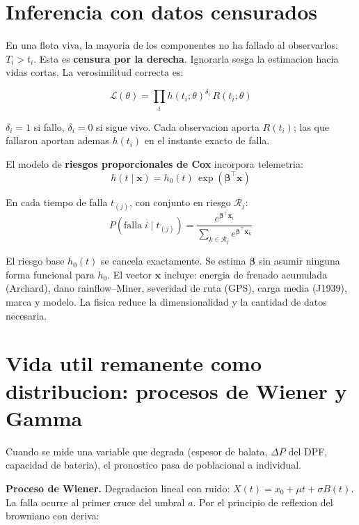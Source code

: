 \documentclass[10.5pt,a4paper]{article}
\begin{document}
\section{Inferencia con datos censurados}

En una flota viva, la mayoria de los componentes no ha fallado al observarlos:
$T_i > t_i$. Esta es \textbf{censura por la derecha}. Ignorarla sesga la estimacion
hacia vidas cortas. La verosimilitud correcta es:

\begin{mathbox}
$$\mathcal{L}(\theta) = \prod_i h(t_i;\theta)^{\delta_i}\,R(t_i;\theta)$$

$\delta_i = 1$ si fallo, $\delta_i = 0$ si sigue vivo. Cada observacion aporta
$R(t_i)$; las que fallaron aportan ademas $h(t_i)$ en el instante exacto de falla.
\end{mathbox}

El modelo de \textbf{riesgos proporcionales de Cox} incorpora telemetria:
$$h(t \mid \mathbf{x}) = h_0(t)\,\exp(\boldsymbol\beta^\top\mathbf{x})$$

En cada tiempo de falla $t_{(j)}$, con conjunto en riesgo $\mathcal{R}_j$:
$$P(\text{falla}\;i \mid t_{(j)}) =
  \frac{e^{\boldsymbol\beta^\top\mathbf{x}_i}}
       {\sum_{k\in\mathcal{R}_j}e^{\boldsymbol\beta^\top\mathbf{x}_k}}$$

El riesgo base $h_0(t)$ se cancela exactamente. Se estima $\boldsymbol\beta$ sin
asumir ninguna forma funcional para $h_0$. El vector $\mathbf{x}$ incluye: energia
de frenado acumulada (Archard), dano rainflow--Miner, severidad de ruta (GPS),
carga media (J1939), marca y modelo. La fisica reduce la dimensionalidad y
la cantidad de datos necesaria.

\section{Vida util remanente como distribucion: procesos de Wiener y Gamma}

Cuando se mide una variable que degrada (espesor de balata, $\Delta P$ del DPF,
capacidad de bateria), el pronostico pasa de poblacional a individual.

\textbf{Proceso de Wiener.} Degradacion lineal con ruido:
$X(t) = x_0 + \mu t + \sigma B(t)$. La falla ocurre al primer cruce del umbral
$a$. Por el principio de reflexion del browniano con deriva:
\end{document}
